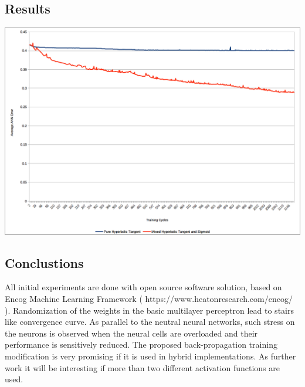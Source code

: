 \documentclass[a0,portrait,25pt]{sciposter}
\begin{document}
\begin{multicols}{3}
\begin{mdframed}[backgroundcolor=white,roundcorner=4pt,shadow=true,linewidth=1pt]
\section*{Results}
\begin{minipage}[c]{1\linewidth}
\includegraphics[width=0.9\linewidth]{fig04}
\end{minipage}
\end{mdframed}

\begin{mdframed}[backgroundcolor=white,roundcorner=4pt,shadow=true,linewidth=1pt]
\color{Black}
\section*{Conclustions}
All initial experiments are done with open source software solution, based on Encog Machine Learning Framework ( https://www.heatonresearch.com/encog/ ). Randomization of the weights in the basic multilayer perceptron lead to stairs like convergence curve. As parallel to the neutral neural networks, such stress on the neurons is observed when the neural cells are overloaded and their performance is sensitively reduced. The proposed back-propagation training modification is very promising if it is used in hybrid implementations. As further work it will be interesting if more than two different activation functions are used. 
\end{mdframed}

\begin{mdframed}[backgroundcolor=white,roundcorner=4pt,shadow=true,linewidth=1pt]
\color{Black}

\end{mdframed}
\end{multicols}
\end{document}
